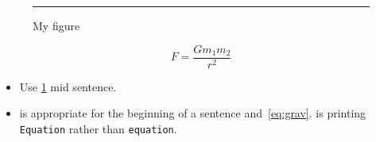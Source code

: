 \documentclass{report}
\begin{document}
\begin{figure}[!htb]
  \centering
  \rule{20pt}{20pt}
  \caption{My figure}
  \label{fig:myfig}
\end{figure}

\begin{equation}
\label{eq:grav} F=\frac{G m_{1} m_{2}}{r^{2}}
\end{equation}

\begin{itemize}
  \item Use \cref{fig:myfig} mid sentence.
 \item {} is appropriate for the beginning of a sentence and~\cref{eq:grav}.  is printing \verb|Equation| rather than \verb|equation|.
\end{itemize}
\end{document}
